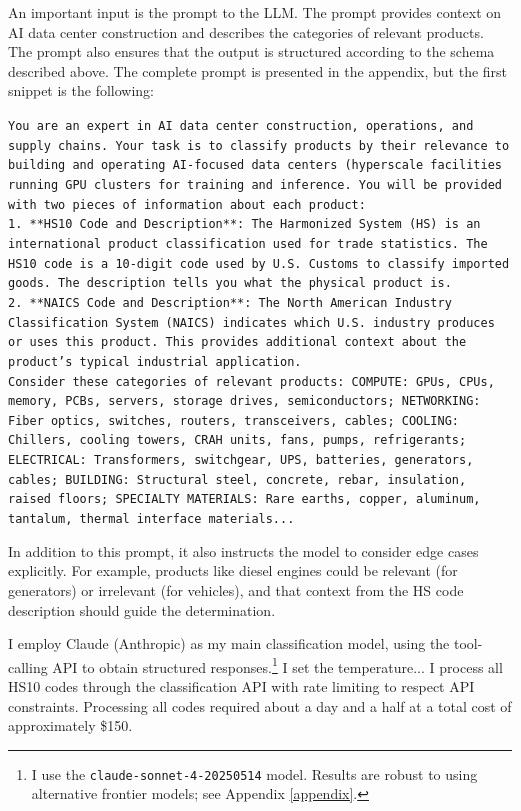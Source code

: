 \documentclass[12pt,pdftex]{article}
\newenvironment{prompt}{\par\medskip\noindent}{\par\medskip}
\begin{document}
\begin{onehalfspacing}
An important input is the prompt to the LLM. The prompt provides context on AI data center construction and describes the categories of relevant products. The prompt also ensures that the output is structured according to the schema described above. The complete prompt is presented in the appendix, but the first snippet is the following:
\begin{prompt}
\texttt{You are an expert in AI data center construction, operations, and supply chains. Your task is to classify products by their relevance to building and operating AI-focused data centers (hyperscale facilities running GPU clusters for training and inference. You will be provided with two pieces of information about each product:}\\

\texttt{1. **HS10 Code and Description**: The Harmonized System (HS) is an international product classification used for trade statistics. The HS10 code is a 10-digit code used by U.S. Customs to classify imported goods. The description tells you what the physical product is.}\\

\texttt{2. **NAICS Code and Description**: The North American Industry Classification System (NAICS) indicates which U.S. industry produces or uses this product. This provides additional context about the product's typical industrial application.}\\

\texttt{Consider these categories of relevant products: COMPUTE: GPUs, CPUs, memory, PCBs, servers, storage drives, semiconductors; NETWORKING: Fiber optics, switches, routers, transceivers, cables; COOLING: Chillers, cooling towers, CRAH units, fans, pumps, refrigerants; ELECTRICAL: Transformers, switchgear, UPS, batteries, generators, cables; BUILDING: Structural steel, concrete, rebar, insulation, raised floors; SPECIALTY MATERIALS: Rare earths, copper, aluminum, tantalum, thermal interface materials...}
\end{prompt}
In addition to this prompt, it also instructs the model to consider edge cases explicitly. For example, products like diesel engines could be relevant (for generators) or irrelevant (for vehicles), and that context from the HS code description should guide the determination.

I employ Claude (Anthropic) as my main classification model, using the tool-calling API to obtain structured responses.\footnote{I use the \texttt{claude-sonnet-4-20250514} model. Results are robust to using alternative frontier models; see Appendix \ref{appendix}.} I set the temperature... I process all \totalTradeHsCodes{} HS10 codes through the classification API with rate limiting to respect API constraints. Processing all codes required about a day and a half at a total cost of approximately \$150.


\end{onehalfspacing}
\end{document}
